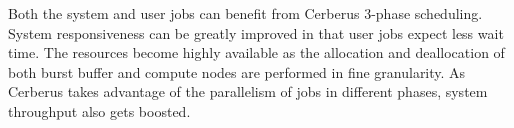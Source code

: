 Both the system and user jobs can benefit from Cerberus 3-phase scheduling.
System responsiveness can be greatly improved in that
user jobs expect less wait time. 
The resources become highly available as the allocation and deallocation of
both burst buffer and compute nodes are performed in fine granularity. 
As Cerberus takes advantage of the parallelism of jobs in different phases,
system throughput also gets boosted.

